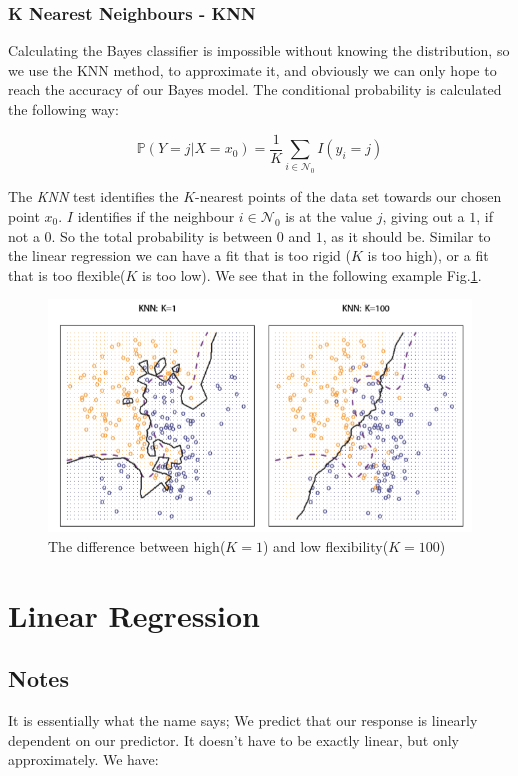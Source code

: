 \documentclass{article}
\begin{document}
\subsubsection{K Nearest Neighbours - KNN}

Calculating the Bayes classifier is impossible without knowing the distribution, so we use the KNN method, to approximate it, and obviously we can only hope to reach the accuracy of our Bayes model. The conditional probability is calculated the following way:


\begin{equation}
\mathbb{P} (Y=j | X = x_0) = \frac{1}{K}\sum _{i \in \mathcal{N} _ 0} I
(y_i=j)
\end{equation}

The \textit{KNN} test identifies the $K$-nearest points of the data set towards our chosen point $x_0$. $I$ identifies if the neighbour $i \in \mathcal{N} _ 0$ is at the value $j$, giving out a $1$, if not a $0$. So the total probability is between $0$ and $1$, as it should be. Similar to the linear regression we can have a fit that is too rigid ($K$ is too high), or a fit that is too flexible($K$ is too low). We see that in the following example Fig.\ref{fig:KNN_high_low_compare}.

\begin{figure}[ht]
    \centering
    \includegraphics[width=\textwidth]{KNN_high_low.png}
    \caption{The difference between high($K=1$) and low flexibility($K=100$)}
    \label{fig:KNN_high_low_compare}
\end{figure}

\newpage

\section{Linear Regression}
\subsection{Notes}
It is essentially what the name says; We predict that our response is linearly dependent on our predictor. It doesn't have to be exactly linear, but only approximately. We have:
\end{document}
